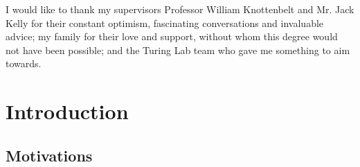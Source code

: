 \documentclass[a4paper,11pt,titlepage]{article}
\begin{document}
\clearpage
\newpage 

\thispagestyle{plain}
\null\newpage

\clearpage
\thispagestyle{plain}
\par{}

I would like to thank my supervisors Professor William Knottenbelt and Mr. Jack Kelly for their constant optimism, fascinating conversations and invaluable advice; my family for their love and support, without whom this degree would not have been possible; and the Turing Lab team who gave me something to aim towards.

\clearpage

\tableofcontents

\clearpage

\section{Introduction}

	\subsection{Motivations}
\end{document}
